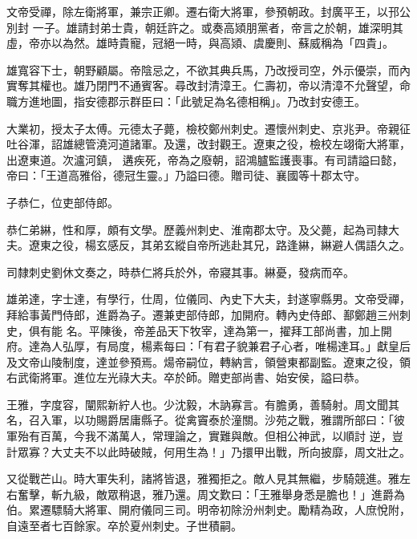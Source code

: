 \begin{pinyinscope}
 文帝受禪，除左衛將軍，兼宗正卿。遷右衛大將軍，參預朝政。封廣平王，以邘公別封
 一子。雄請封弟士貴，朝廷許之。或奏高熲朋黨者，帝言之於朝，雄深明其虛，帝亦以為然。雄時貴寵，冠絕一時，與高熲、虞慶則、蘇威稱為「四貴」。



 雄寬容下士，朝野顧屬。帝陰忌之，不欲其典兵馬，乃改授司空，外示優崇，而內實奪其權也。雄乃閉門不通賓客。尋改封清漳王。仁壽初，帝以清漳不允聲望，命職方進地圖，指安德郡示群臣曰：「此號足為名德相稱」。乃改封安德王。



 大業初，授太子太傅。元德太子薨，檢校鄭州刺史。遷懷州刺史、京兆尹。帝親征吐谷渾，詔雄總管澆河道諸軍。及還，改封觀王。遼東之役，檢校左翊衛大將軍，出遼東道。次瀘河鎮，
 遘疾死，帝為之廢朝，詔鴻臚監護喪事。有司請謚曰懿，帝曰：「王道高雅俗，德冠生靈。」乃謚曰德。贈司徒、襄國等十郡太守。



 子恭仁，位吏部侍郎。



 恭仁弟綝，性和厚，頗有文學。歷義州刺史、淮南郡太守。及父薨，起為司隸大夫。遼東之役，楊玄感反，其弟玄縱自帝所逃赴其兄，路逢綝，綝避人偶語久之。



 司隸刺史劉休文奏之，時恭仁將兵於外，帝寢其事。綝憂，發病而卒。



 雄弟達，字士達，有學行，仕周，位儀同、內史下大夫，封遂寧縣男。文帝受禪，拜給事黃門侍郎，進爵為子。遷兼吏部侍郎，加開府。轉內史侍郎、鄯鄭趙三州刺史，俱有能
 名。平陳後，帝差品天下牧宰，達為第一，擢拜工部尚書，加上開府。達為人弘厚，有局度，楊素每曰：「有君子貌兼君子心者，唯楊達耳。」獻皇后及文帝山陵制度，達並參預焉。煬帝嗣位，轉納言，領營東都副監。遼東之役，領右武衛將軍。進位左光祿大夫。卒於師。贈吏部尚書、始安侯，謚曰恭。



 王雅，字度容，闡熙新紵人也。少沈毅，木訥寡言。有膽勇，善騎射。周文聞其名，召入軍，以功賜爵居庸縣子。從禽竇泰於潼關。沙苑之戰，雅謂所部曰：「彼軍殆有百萬，今我不滿萬人，常理論之，實難與敵。但相公神武，以順討
 逆，豈計眾寡？大丈夫不以此時破賊，何用生為！」乃擐甲出戰，所向披靡，周文壯之。



 又從戰芒山。時大軍失利，諸將皆退，雅獨拒之。敵人見其無繼，步騎競進。雅左右奮擊，斬九級，敵眾稍退，雅乃還。周文歎曰：「王雅舉身悉是膽也！」進爵為伯。累遷驃騎大將軍、開府儀同三司。明帝初除汾州刺史。勵精為政，人庶悅附，自遠至者七百餘家。卒於夏州刺史。子世積嗣。




\end{pinyinscope}
